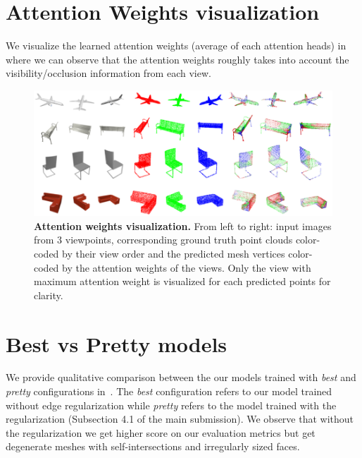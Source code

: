 \section{Attention Weights visualization}
We visualize the learned attention weights (average of each attention heads) in~ where we can observe that the attention weights roughly takes into account the visibility/occlusion information from each view.
\begin{figure}[t]
\begin{center}
\includegraphics[width=\linewidth]{imgs/attention_weights_visualization.png}
\end{center}
    \caption{
        \textbf{Attention weights visualization.}
        From left to right: input images from 3 viewpoints, corresponding ground truth point clouds color-coded by their view order and the predicted mesh vertices color-coded by the attention weights of the views.
        Only the view with maximum attention weight is visualized for each predicted points for clarity.
    }
\label{fig:attention_weights}
\end{figure}

\section{Best vs Pretty models}

We provide qualitative comparison between the our models trained with \emph{best} and \emph{pretty} configurations in~.
The \emph{best} configuration refers to our model trained without edge regularization while \emph{pretty} refers to the model trained with the regularization (Subsection 4.1 of the main submission).
We observe that without the regularization we get higher score on our evaluation metrics but get degenerate meshes with self-intersections and irregularly sized faces.

